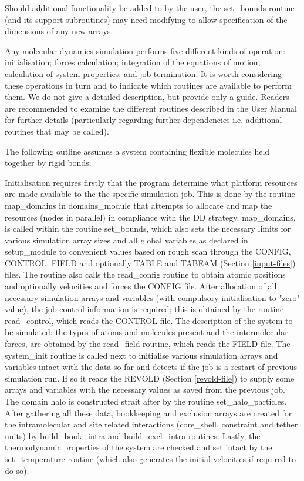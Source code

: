 Should additional functionality be added to \D by the user, the
{\sc set\_bounds} routine (and its support subroutines) may need
modifying to allow specification of the dimensions of any new
arrays.

Any molecular dynamics simulation performs five different kinds of
operation: initialisation; forces calculation; integration of the
equations of motion; calculation of system properties; and job
termination.  It is worth considering these operations in turn and
to indicate which \D routines are available to perform them.  We do
not give a detailed description, but provide only a guide.  Readers
are recommended to examine the different routines described in the
\D User Manual for further details (particularly regarding further
dependencies i.e. additional routines that may be called).

The following outline assumes a system containing flexible molecules
held together by rigid bonds.

Initialisation requires firstly that the program determine what
platform resources are made available to the the specific simulation
job.  This is done by the \D routine {\sc map\_domains} in
{\sc domains\_module} that attempts to allocate and map the
resources (nodes in parallel) in compliance with the DD
strategy.  {\sc map\_domains}, is called
within the routine {\sc set\_bounds}, which also sets the necessary
limits for various simulation array sizes and all global
variables as declared in {\sc setup\_module} to convenient values
based on rough scan through the CONFIG, CONTROL, FIELD and optionally
TABLE and TABEAM (Section \ref{input-files}) files.  The routine also
calls the {\sc read\_config} routine to obtain atomic positions and
optionally velocities and forces the CONFIG file.  After allocation
of all necessary simulation arrays and variables (with compulsory
initialisation to "zero" value), the job control information is
required; this is obtained by the routine {\sc read\_control}, which
reads the CONTROL file.  The description of the system to be
simulated: the types of atoms and molecules present and the
intermolecular forces, are obtained by the {\sc read\_field} routine,
which reads the FIELD file.  The {\sc system\_init} routine is
called next to initialise various simulation arrays and variables
intact with the data so far and detects if the job is a restart of
previous simulation run.  If so it reads the REVOLD (Section
\ref{revold-file}) to supply some arrays and variables with the
necessary values as saved from the previous job.  The domain halo is
constructed strait after by the routine {\sc set\_halo\_particles}.
After gathering all these data, bookkeeping and exclusion arrays are
created for the intramolecular and site related interactions
(core\_shell, constraint and tether units) by {\sc build\_book\_intra}
and {\sc build\_excl\_intra} routines.  Lastly, the thermodynamic
properties of the system are checked and set intact by the
{\sc set\_temperature} routine (which also generates the initial
velocities if required to do so).

